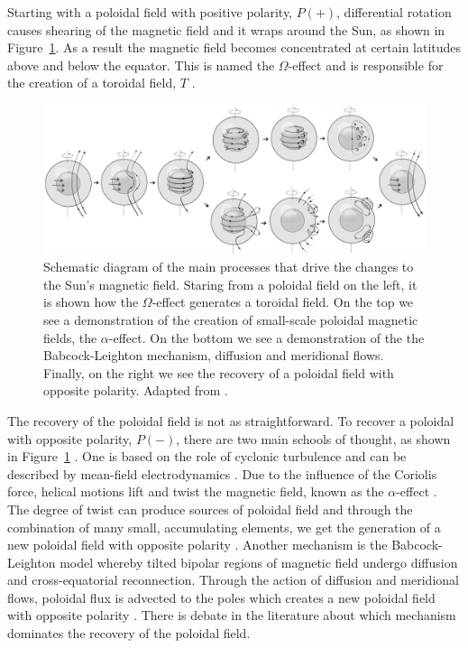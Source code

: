 Starting with a poloidal field with positive polarity, $P(+)$, differential rotation causes shearing of the magnetic field and it wraps around the Sun, as shown in Figure~\ref{fig:dynamo}. As a result the magnetic field becomes concentrated at certain latitudes above and below the equator. This is named the $\Omega$-effect and is responsible for the creation of a toroidal field, $T$ \citep{hathaway_solar_2015, charbonneau_dynamo_2020}.

\begin{figure}[ht!]
	\centering
	\includegraphics[width=0.95\columnwidth]{sun_dynamo.jpg}
	\caption{Schematic diagram of the main processes that drive the changes to the Sun's magnetic field. Staring from a poloidal field on the left, it is shown how the $\Omega$-effect generates a toroidal field. On the top we see a demonstration of the creation of small-scale poloidal magnetic fields, the $\alpha$-effect. On the bottom we see a demonstration of the the Babcock-Leighton mechanism, diffusion and meridional flows. Finally, on the right we see the recovery of a poloidal field with opposite polarity. Adapted from \citet{sanchez_mean-field_2014}.}
	\label{fig:dynamo}
\end{figure}

The recovery of the poloidal field is not as straightforward. To recover a poloidal with opposite polarity, $P(-)$, there are two main schools of thought, as shown in Figure~\ref{fig:dynamo} \citep{sanchez_mean-field_2014}. One is based on the role of cyclonic turbulence and can be described by mean-field electrodynamics \citep{charbonneau_dynamo_2020}. Due to the influence of the Coriolis force, helical motions lift and twist the magnetic field, known as the $\alpha$-effect \citep{charbonneau_dynamo_2020}. The degree of twist can produce sources of poloidal field and through the combination of many small, accumulating elements, we get the generation of a new poloidal field with opposite polarity \citep{charbonneau_dynamo_2020}. Another mechanism is the Babcock-Leighton model \citep{babcock_topology_1961, leighton_transport_1964} whereby tilted bipolar regions of magnetic field undergo diffusion and cross-equatorial reconnection. Through the action of diffusion and meridional flows, poloidal flux is advected to the poles which creates a new poloidal field with opposite polarity \citep{sheeley_surface_2005, charbonneau_dynamo_2020}. There is debate in the literature about which mechanism dominates the recovery of the poloidal field.

